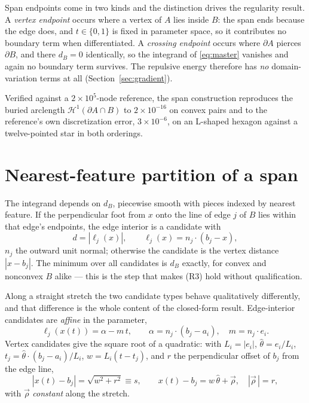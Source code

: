 \documentclass[11pt]{article}
\begin{document}
Span endpoints come in two kinds and the distinction drives the regularity result. A \emph{vertex endpoint} occurs where a vertex of $A$ lies inside $B$: the span ends because the edge does, and $t\in\{0,1\}$ is fixed in parameter space, so it contributes no boundary term when differentiated. A \emph{crossing endpoint} occurs where $\partial A$ pierces $\partial B$, and there $d_B = 0$ identically, so the integrand of \eqref{eq:master} vanishes and again no boundary term survives. The repulsive energy therefore has \emph{no} domain-variation terms at all (Section~\ref{sec:gradient}).

Verified against a $2\times10^5$-node reference, the span construction reproduces the buried arclength $\mathcal H^1(\partial A\cap B)$ to $2\times10^{-16}$ on convex pairs and to the reference's own discretization error, $3\times10^{-6}$, on an L-shaped hexagon against a twelve-pointed star in both orderings.

\section{Nearest-feature partition of a span}
\label{sec:features}

The integrand depends on $d_B$, piecewise smooth with pieces indexed by nearest feature. If the perpendicular foot from $x$ onto the line of edge $j$ of $B$ lies within that edge's endpoints, the edge interior is a candidate with
\begin{equation}
d = |\ell_j(x)|, \qquad \ell_j(x) = n_j\cdot(b_j - x),
\end{equation}
$n_j$ the outward unit normal; otherwise the candidate is the vertex distance $|x-b_j|$. The minimum over all candidates is $d_B$ exactly, for convex and nonconvex $B$ alike --- this is the step that makes (R3) hold without qualification.

Along a straight stretch the two candidate types behave qualitatively differently, and that difference is the whole content of the closed-form result. Edge-interior candidates are \emph{affine} in the parameter,
\begin{equation}
\ell_j(x(t)) = \alpha - m\,t, \qquad \alpha = n_j\cdot(b_j-a_i), \quad m = n_j\cdot e_i .
\label{eq:affine}
\end{equation}
Vertex candidates give the square root of a quadratic: with $L_i = |e_i|$, $\hat\theta = e_i/L_i$, $t_j = \hat\theta\cdot(b_j-a_i)/L_i$, $w = L_i(t-t_j)$, and $r$ the perpendicular offset of $b_j$ from the edge line,
\begin{equation}
|x(t)-b_j| = \sqrt{w^2+r^2} \equiv s, \qquad x(t)-b_j = w\,\hat\theta + \vec\rho, \quad |\vec\rho\,| = r,
\label{eq:quad}
\end{equation}
with $\vec\rho$ \emph{constant} along the stretch.
\end{document}
